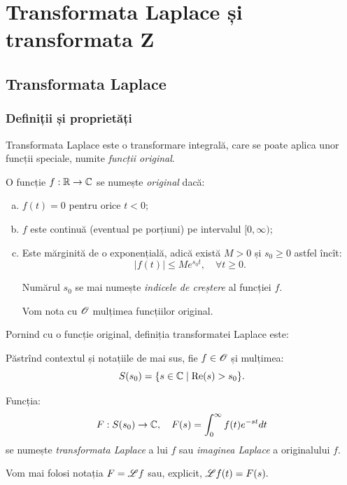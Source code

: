 
\chapter{Transformata Laplace și transformata Z}

\section{Transformata Laplace}

\subsection{Definiții și proprietăți}

Transformata Laplace este o transformare integrală, care se poate aplica unor
funcții speciale, numite \emph{funcții original}.

\begin{definition}\label{def:orig}
  O funcție $ f : \mathbb{R} \to \mathbb{C} $ se numește \emph{original} dacă:
  \begin{enumerate}[(a)]
  \item $ f(t) = 0 $ pentru orice $ t < 0 $;
  \item $ f $ este continuă (eventual pe porțiuni) pe intervalul $ [0, \infty) $;
  \item Este mărginită de o exponențială, adică există $ M > 0 $ și $ s_0 \geq 0 $
    astfel încît:
    \[
      |f(t)| \leq Me^{s_0 t}, \quad \forall t \geq 0.
    \]

    Numărul $ s_0 $ se mai numește \emph{indicele de creștere} al
    funcției $ f $.

    Vom nota cu $ \mathscr{O} $ mulțimea funcțiilor original.
  \end{enumerate}
\end{definition}

Pornind cu o funcție original, definiția transformatei Laplace este:
\begin{definition}\label{def:lapl}
  Păstrînd contextul și notațiile de mai sus, fie $ f \in \mathscr{O} $ și
  mulțimea:
  \[
    S(s_0) = \{ s \in \mathbb{C} \mid \mathrm{Re}(s) > s_0 \}.
  \]

  Funcția:
  \[
    F : S(s_0) \to \mathbb{C}, \quad F(s) = \int_0^\infty f(t) e^{-st} dt
  \]
  se numește \emph{transformata Laplace} a lui $ f $ sau \emph{imaginea Laplace}
  a originalului $ f $.

  Vom mai folosi notația $ F = \mathscr{L} f $ sau, explicit, $ \mathscr{L} f(t) = F(s). $
\end{definition}

